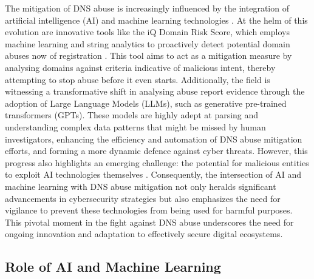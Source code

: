 The mitigation of DNS abuse is increasingly influenced by the integration of artificial intelligence (AI) and machine learning technologies \cite{goethals2021enabling}. At the helm of this evolution are innovative tools like the iQ Domain Risk Score, which employs machine learning and string analytics to proactively detect potential domain abuses now of registration \cite{dnsabuseAI2023}. This tool aims to act as a mitigation measure by analysing domains against criteria indicative of malicious intent, thereby attempting to stop abuse before it even starts. Additionally, the field is witnessing a transformative shift in analysing abuse report evidence through the adoption of Large Language Models (LLMs), such as generative pre-trained transformers (GPTs). These models are highly adept at parsing and understanding complex data patterns that might be missed by human investigators, enhancing the efficiency and automation of DNS abuse mitigation efforts, and forming a more dynamic defence against cyber threats. However, this progress also highlights an emerging challenge: the potential for malicious entities to exploit AI technologies themselves \cite{halvorsenAI2023}.  Consequently, the intersection of AI and machine learning with DNS abuse mitigation not only heralds significant advancements in cybersecurity strategies but also emphasizes the need for vigilance to prevent these technologies from being used for harmful purposes. This pivotal moment in the fight against DNS abuse underscores the need for ongoing innovation and adaptation to effectively secure digital ecosystems.

\subsection{Role of AI and Machine Learning}

